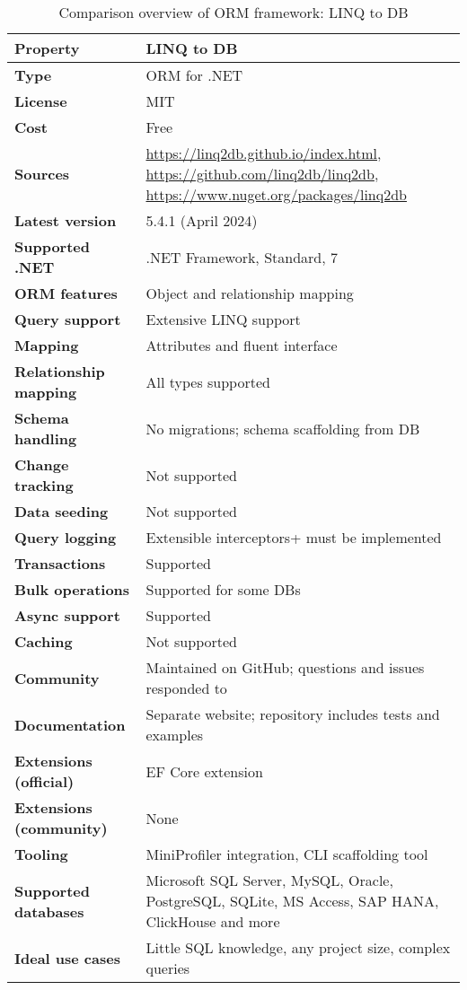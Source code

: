 \begin{table}[H]
\centering
\caption{Comparison overview of ORM framework: LINQ to DB}
\begin{tabular}{|l|l|}
\toprule
\textbf{Property} & \textbf{LINQ to DB} \\
\midrule
\textbf{Type} & ORM for .NET \\
\textbf{License} & MIT \\
\textbf{Cost} & Free \\
\textbf{Sources} & \url{https://linq2db.github.io/index.html}, \url{https://github.com/linq2db/linq2db}, \url{https://www.nuget.org/packages/linq2db}  \\
\textbf{Latest version} & 5.4.1 (April 2024) \\
\textbf{Supported .NET} & .NET Framework, Standard, 7 \\
\textbf{ORM features} & Object and relationship mapping \\
\textbf{Query support} & Extensive LINQ support \\
\textbf{Mapping} & Attributes and fluent interface \\
\textbf{Relationship mapping} & All types supported \\
\textbf{Schema handling} & No migrations; schema scaffolding from DB \\
\textbf{Change tracking} & Not supported \\
\textbf{Data seeding} & Not supported \\
\textbf{Query logging} & Extensible interceptors+ must be implemented \\
\textbf{Transactions} & Supported \\
\textbf{Bulk operations} & Supported for some DBs\\
\textbf{Async support} & Supported \\
\textbf{Caching} & Not supported \\
\textbf{Community} & Maintained on GitHub; questions and issues responded to \\
\textbf{Documentation} & Separate website; repository includes tests and examples\\
\textbf{Extensions (official)} & EF Core extension \\
\textbf{Extensions (community)} & None \\
\textbf{Tooling} & MiniProfiler integration, CLI scaffolding tool \\
\textbf{Supported databases} & Microsoft SQL Server, MySQL, Oracle, PostgreSQL, SQLite, MS Access, SAP HANA, ClickHouse and more  \\
\textbf{Ideal use cases} & Little SQL knowledge, any project size, complex queries \\
\bottomrule
\end{tabular}
\end{table}


